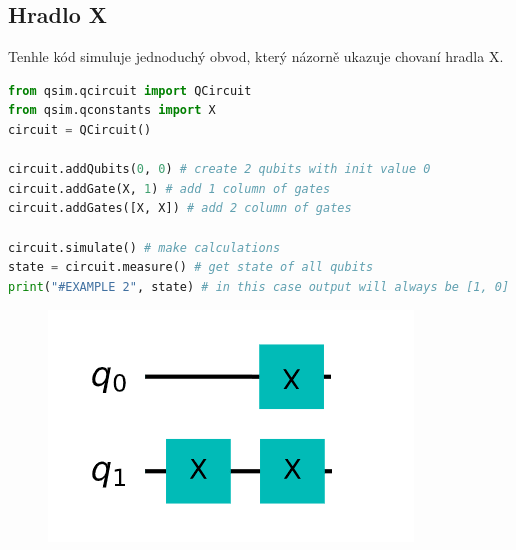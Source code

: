 \documentclass[11pt]{article}
\begin{document}
\subsection{Hradlo X}
Tenhle kód simuluje jednoduchý obvod, který názorně ukazuje chovaní hradla X.
\begin{lstlisting}[language=Python, caption=X gates]
from qsim.qcircuit import QCircuit
from qsim.qconstants import X
circuit = QCircuit()

circuit.addQubits(0, 0) # create 2 qubits with init value 0
circuit.addGate(X, 1) # add 1 column of gates
circuit.addGates([X, X]) # add 2 column of gates

circuit.simulate() # make calculations
state = circuit.measure() # get state of all qubits
print("#EXAMPLE 2", state) # in this case output will always be [1, 0]
\end{lstlisting}
\begin{figure}[H]
    \includegraphics[scale=.5]{multiple_qubits_scheme}
    \centering
\end{figure}
\end{document}
